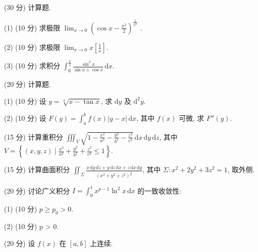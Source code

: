 (30 分) 计算题.\par
(1) (10 分) 求极限  $\lim_{x\to0}\left(\cos x-\frac{x^{2}}{2}\right)^{\frac{1}{x^{2}}}$ .\par
(2) (10 分) 求极限 $\lim_{x\to 0}x\left[\frac{1}{x}\right]$.\par
(3) (10 分) 求积分 $\int_{0}^{\frac{\pi}{2}} \frac{\sin^{2} x}{\sin x + \cos x} \, \mathrm{d}x$.\par
(20 分) 计算题.\par
(1) (10 分) 设 $y = \sqrt[3]{x - \tan x}$, 求 $\mathrm{d}y$ 及 $\mathrm{d}^2 y$.\par
(2) (10 分) 设 $F(y) = \int_{a}^{b} f(x) |y - x| \, \mathrm{d}x$, 其中 $f(x)$ 可微, 求 $F''(y)$.\par
(15 分) 计算重积分 $\iiint_{V} \sqrt{1 - \frac{x^2}{a^2} - \frac{y^2}{b^2} - \frac{z^2}{c^2}} \, \mathrm{d}x \, \mathrm{d}y \, \mathrm{d}z$, 其中 $V = \left\{(x, y, z) \mid \frac{x^2}{a^2} + \frac{y^2}{b^2} + \frac{z^2}{c^2} \leq 1\right\}$.\par
(15 分) 计算曲面积分 $\iint_{\Sigma} \frac{x \, \mathrm{d}y \, \mathrm{d}z + y \, \mathrm{d}z \, \mathrm{d}x + z \, \mathrm{d}x \, \mathrm{d}y}{(x^2 + y^2 + z^2)^{\frac{3}{2}}}$, 其中 $\Sigma: x^2 + 2y^2 + 3z^2 = 1$, 取外侧.\par
(20 分) 讨论广义积分 $I = \int_{0}^{1} x^{p-1} \ln^{2} x \, \mathrm{d}x$ 的一致收敛性:\par
(1) (10 分) $p \geq p_0 > 0$.\par
(2) (10 分) p > 0.\par
(20 分) 设 $f(x)$ 在 $[a, b]$ 上连续.\par
